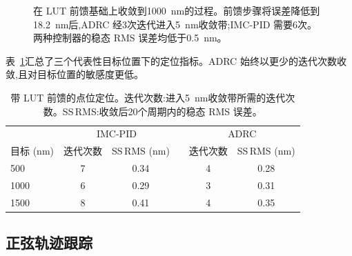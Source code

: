 \documentclass[fleqn,10pt]{wlscirep}
\begin{document}
\begin{figure}[ht]
    \centering
    \caption{在 LUT 前馈基础上收敛到\SI{1000}{nm}的过程。前馈步骤将误差降低到\SI{18.2}{nm}后,ADRC 经3次迭代进入\SI{5}{nm}收敛带;IMC-PID 需要6次。两种控制器的稳态 RMS 误差均低于\SI{0.5}{nm}。}
    \label{fig:conv}
\end{figure}

表~\ref{tab:positioning}汇总了三个代表性目标位置下的定位指标。ADRC 始终以更少的迭代次数收敛,且对目标位置的敏感度更低。

\begin{table}[ht]
    \centering
    \caption{带 LUT 前馈的点位定位。迭代次数:进入\SI{5}{nm}收敛带所需的迭代次数。SS\,RMS:收敛后20个周期内的稳态 RMS 误差。}
    \label{tab:positioning}
    \begin{tabular}{lccccc}
        \toprule
        & \multicolumn{2}{c}{IMC-PID} & & \multicolumn{2}{c}{ADRC} \\
        \cmidrule(lr){2-3} \cmidrule(lr){5-6}
        目标 (nm) & 迭代次数 & SS\,RMS (nm) & & 迭代次数 & SS\,RMS (nm) \\
        \midrule
        500   & 7 & 0.34 & & 4 & 0.28 \\
        1000  & 6 & 0.29 & & 3 & 0.31 \\
        1500  & 8 & 0.41 & & 4 & 0.35 \\
        \bottomrule
    \end{tabular}
\end{table}

\subsection*{正弦轨迹跟踪}
\end{document}
